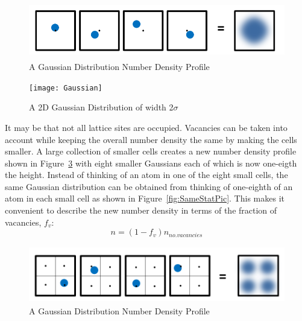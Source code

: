 \documentclass[double,12pt]{beavtex}
\begin{document}
  \begin{figure}[h!]
    \centering
    \includegraphics[height=2.5cm]{Ensemble_Gaussian.png}
    \caption{A Gaussian Distribution Number Density Profile}
    \label{fig:Ensemble_Gaus}
  \end{figure} 

 \begin{figure}[h!]
    \centering
    \texttt{[image: Gaussian]}
    \caption{A 2D Gaussian Distribution of width 2$\sigma$}
    \label{fig:Gaus_plot}
  \end{figure}  

It may be that not all lattice sites are occupied. Vacancies can be taken 
into account while keeping %
the overall number density the same by 
making the cells smaller. A large collection of smaller cells creates a 
new number density profile shown in Figure~\ref{fig:Ensemble_Smallcells} 
with eight smaller Gaussians each of which is now one-eigth the height. 
Instead of thinking of an atom in one of the eight small cells, the same 
Gaussian distribution can be obtained from thinking of one-eighth of an 
atom in each small cell as shown in Figure~\ref{fig:SameStatPic}. 
This makes it convenient to describe the new 
number density in terms of the fraction of vacancies, $f_v$: 
\begin{displaymath}{ n = (1-f_v){n_{no.vacancies}}}\end{displaymath} 

 \begin{figure}[h!]
    \centering
    \includegraphics[height=2.5cm]{Ensemble_Smallcells.png}
    \caption{A Gaussian Distribution Number Density Profile}
    \label{fig:Ensemble_Smallcells}
  \end{figure} 
\end{document}
